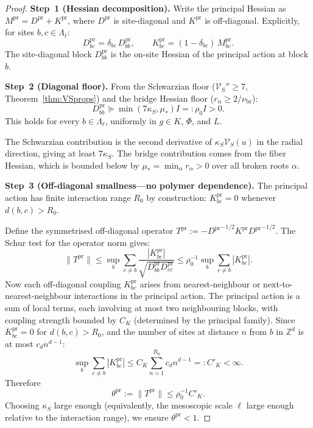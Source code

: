 \documentclass[12pt]{article}
\theoremstyle{plain}
\theoremstyle{definition}
\numberwithin{equation}{section}
\newcommand{\Z}{\mathbb{Z}}
\newcommand{\pr}{\mathrm{pr}}
\newcommand{\br}{\mathrm{br}}
\begin{document}
\begin{proof}
\textbf{Step~1 (Hessian decomposition).}
Write the principal Hessian as $M^{\pr}=D^{\pr}+K^{\pr}$, where $D^{\pr}$ is site-diagonal and $K^{\pr}$ is off-diagonal.  Explicitly, for sites $b,c\in\Lambda_\ell$:
\begin{equation}
D^{\pr}_{bc} = \delta_{bc}\,D^{\pr}_{bb},\qquad K^{\pr}_{bc} = (1-\delta_{bc})\,M^{\pr}_{bc}.
\end{equation}
The site-diagonal block $D^{\pr}_{bb}$ is the on-site Hessian of the principal action at block $b$.

\textbf{Step~2 (Diagonal floor).}
From the Schwarzian floor ($\mathcal{V}_S''\geq 7$, Theorem~\ref{thm:VSprops}) and the bridge Hessian floor ($r_\alpha\geq 2/\nu_{\br}$):
\begin{equation}
D^{\pr}_{bb} \succeq \min(7\kappa_S,\mu_*) I =: \rho_0 I > 0.
\end{equation}
This holds for every $b\in\Lambda_\ell$, uniformly in $g\in K$, $\Phi$, and $L$.

The Schwarzian contribution is the second derivative of $\kappa_S\mathcal{V}_S(u)$ in the radial direction, giving at least $7\kappa_S$.  The bridge contribution comes from the fiber Hessian, which is bounded below by $\mu_*=\min_\alpha r_\alpha>0$ over all broken roots $\alpha$.

\textbf{Step~3 (Off-diagonal smallness---no polymer dependence).}
The principal action has finite interaction range $R_0$ by construction: $K^{\pr}_{bc}=0$ whenever $d(b,c)>R_0$.

Define the symmetrised off-diagonal operator $T^{\pr}:=-{D^{\pr}}^{-1/2}K^{\pr}{D^{\pr}}^{-1/2}$.  The Schur test for the operator norm gives:
\begin{equation}
\|T^{\pr}\| \leq \sup_b\sum_{c\neq b}\frac{|K^{\pr}_{bc}|}{\sqrt{D^{\pr}_{bb}D^{\pr}_{cc}}}
\leq \rho_0^{-1}\sup_b\sum_{c\neq b}|K^{\pr}_{bc}|.
\end{equation}
Now each off-diagonal coupling $K^{\pr}_{bc}$ arises from nearest-neighbour or next-to-nearest-neighbour interactions in the principal action.  The principal action is a sum of local terms, each involving at most two neighbouring blocks, with coupling strength bounded by $C_K$ (determined by the principal family).  Since $K^{\pr}_{bc}=0$ for $d(b,c)>R_0$, and the number of sites at distance $n$ from $b$ in $\Z^d$ is at most $c_d n^{d-1}$:
\begin{equation}
\sup_b\sum_{c\neq b}|K^{\pr}_{bc}| \leq C_K\sum_{n=1}^{R_0}c_d n^{d-1} =: C'_K < \infty.
\end{equation}
Therefore
\begin{equation}
\theta^{\pr} := \|T^{\pr}\| \leq \rho_0^{-1}C'_K.
\end{equation}
Choosing $\kappa_S$ large enough (equivalently, the mesoscopic scale $\ell$ large enough relative to the interaction range), we ensure $\theta^{\pr}<1$.


\end{proof}
\end{document}
